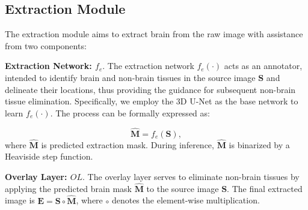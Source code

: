 

\vspace{-3pt}
\subsection{Extraction Module}

The extraction module aims to extract brain from the raw image with assistance from two components:

\vspace{1pt}
\noindent \textbf{Extraction Network: $f_{e}$}. The extraction network $f_{e}(\cdot)$ acts as an annotator, intended to identify brain and non-brain tissues in the source image $\mathbf{S}$ and delineate their locations, thus providing the guidance for subsequent non-brain tissue elimination. Specifically, we employ the 3D U-Net as the base network to learn $f_{e}(\cdot)$.
The process can be formally expressed as:

\begin{equation}
\hat{\mathbf{M}}=f_{e}\left(\mathbf{S}\right),
\end{equation}
where $\hat{\mathbf{M}}$ is predicted extraction mask. During inference, $\hat{\mathbf{M}}$ is binarized by a Heaviside step function.

\vspace{1pt}
\noindent \textbf{Overlay Layer: $OL$}.
The overlay layer serves to eliminate non-brain tissues by applying the predicted brain mask $\hat{\mathbf{M}}$ to the source image $\mathbf{S}$. The final extracted image is $ \mathbf{E} = \mathbf{S}\circ \hat{\mathbf{M}}$, where $\circ$ denotes the element-wise multiplication.

